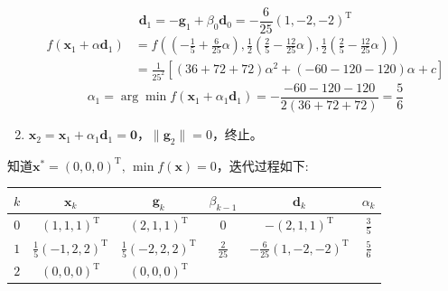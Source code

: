 \begin{example}
\begin{solution}
\begin{enumerate}
            \[
                \boldsymbol{d}_{1} = -\boldsymbol{g}_1+\beta_{0}\boldsymbol{d}_0 = -\frac{6}{25}(1,-2,-2)^{\mathrm{T}}
            \]
            \[
                \begin{array}{ll}
                     f(\boldsymbol{x}_1+\alpha \boldsymbol{d}_1)&=f( (-\frac{1}{5}+\frac{6}{25}\alpha),\frac{1}{2}(\frac{2}{5}-\frac{12}{25}\alpha),\frac{1}{2}(\frac{2}{5}-\frac{12}{25}\alpha) )\\
                    &=\frac{1}{25^2}\left[ (36+72+72)\alpha^2+(-60-120-120)\alpha+c \right]
                \end{array}
            \]
            \[
                \alpha_1 = \arg\min f(\boldsymbol{x}_1+\alpha_1\boldsymbol{d}_1) = -\frac{-60-120-120}{2(36+72+72)} = \frac{5}{6}
            \]
            \item $\boldsymbol{x}_2 = \boldsymbol{x}_1 + \alpha_1\boldsymbol{d}_1 = \boldsymbol{0}$，$\|\boldsymbol{g}_2\| = 0$，终止。
        \end{enumerate}
        知道$\boldsymbol{x}^* = (0,0,0)^{\mathrm{T}},\,\min f(\boldsymbol{x}) = 0$，迭代过程如下:
        \begin{table}[htbp]
            \centering
            \begin{tabular}{c|c|c|c|c|c}
                \hline
                $k$ & $\boldsymbol{x}_k$ & $\boldsymbol{g}_k$ & $\beta_{k-1}$ & $\boldsymbol{d}_k$ & $\alpha_k$\\\hline
                $0$ & $ (1,1,1)^{\mathrm{T}} $ & $(2,1,1)^{\mathrm{T}}$ & $0$ & $ -(2,1,1)^{\mathrm{T}} $ & $\frac{3}{5}$\\\hline
                $1$ & $ \frac{1}{5}(-1,2,2)^{\mathrm{T}} $ & $\frac{1}{5}(-2,2,2)^{\mathrm{T}}$ & $\frac{2}{25}$ & $ -\frac{6}{25}(1,-2,-2)^{\mathrm{T}} $ & $\frac{5}{6}$\\\hline
                $2$ & $(0,0,0)^{\mathrm{T}}$ & $(0,0,0)^{\mathrm{T}}$ & \\\hline
            \end{tabular}
        \end{table}
    \end{solution}
\end{example}
